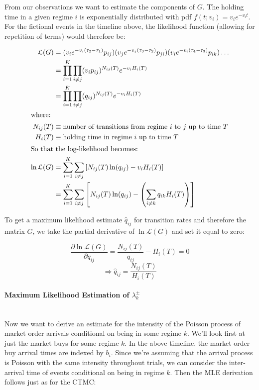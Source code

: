 \documentclass[12pt]{report}
\begin{document}
From our observations we want to estimate the components of $G$. The holding time in a given regime $i$ is exponentially distributed with pdf $f(t;v_i) = v_i e^{-v_i t}$. For the fictional events in the timeline above, the likelihood function (allowing for repetition of terms) would therefore be:

\begin{align*}
\mathcal{L}(G) &= (v_{i} e^{-v_{i}(\tau_2 - \tau_1)} p_{ij}) (v_{j} e^{-v_{j}(\tau_3 - \tau_2)} p_{ji}) (v_{i} e^{-v_{i}(\tau_4 - \tau_3)} p_{ik}) \dots \\
&= \prod\limits_{i=1}^{K} \prod\limits_{i \neq j} (v_{i}p_{ij})^{N_{ij}(T)} e^{-v_{i}H_i(T)} \\
&= \prod\limits_{i=1}^{K} \prod\limits_{i \neq j} (q_{ij})^{N_{ij}(T)} e^{-v_{i}H_i(T)} \\
\intertext{where:}
N_{ij}(T) & \equiv \mbox{number of transitions from regime $i$ to $j$ up to time $T$} \\
H_{i}(T) & \equiv \mbox{holding time in regime $i$ up to time $T$} \\
\intertext{So that the log-likelihood becomes:} 
\ln \mathcal{L}(G) & = \sum\limits_{i=1}^{K} \sum\limits_{i \neq j} \left[ N_{ij}(T) \ln(q_{ij}) - v_{i} H_i(T) \right] \\
&= \sum\limits_{i=1}^{K} \sum\limits_{i \neq j} \left[ N_{ij}(T) \ln(q_{ij}) - \left( \sum\limits_{i \neq k} q_{ik} H_i(T) \right) \right]
\end{align*}

To get a maximum likelihood estimate $\hat{q}_{ij}$ for transition rates and therefore the matrix $G$, we take the partial derivative of $\ln \mathcal{L}(G)$ and set it equal to zero:

$$\dfrac{\partial \ln \mathcal{L}(G)}{\partial q_{ij}} = \dfrac{N_{ij}(T)}{q_{ij}} - H_i(T) = 0$$
$$ \Rightarrow \hat{q}_{ij} = \dfrac{N_{ij}(T)}{H_i(T)}$$



\paragraph{Maximum Likelihood Estimation of $\lambda^{\pm}_k$} \mbox{} \\

Now we want to derive an estimate for the intensity of the Poisson process of market order arrivals conditional on being in some regime $k$. We'll look first at just the market buys for some regime $k$. In the above timeline, the market order buy arrival times are indexed by $b_i$. Since we're assuming that the arrival process is Poisson with the same intensity throughout trials, we can consider the inter-arrival time of events conditional on being in regime $k$. Then the MLE derivation follows just as for the CTMC:
\end{document}
